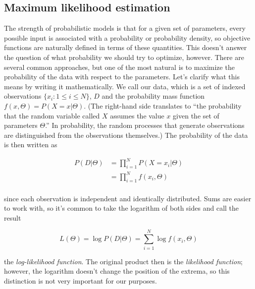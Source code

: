 \subsection{Maximum likelihood estimation}

The strength of probabilistic models is that for a given set of parameters, every possible input is associated with a probability or probability density, so objective functions are naturally defined in terms of these quantities. This doesn't answer the question of what probability we should try to optimize, however. There are several common approaches, but one of the most natural is to maximize the probability of the data with respect to the parameters. Let's clarify what this means by writing it mathematically. We call our data, which is a set of indexed observations $\{x_i:1 \le i \le N\}$, $D$ and the probability mass function $f(x, \Theta) = P(X = x | \Theta)$. (The right-hand side translates to ``the probability that the random variable called $X$ assumes the value $x$ given the set of parameters $\Theta$.'' In probability, the random processes that generate observations are distinguished from the observations themselves.) The probability of the data is then written as

\begin{align*}
P(D|\Theta)
&= \prod_{i=1}^N P(X=x_i | \Theta) \\
&= \prod_{i=1}^N f(x_i, \Theta) \\
\end{align*}

since each observation is independent and identically distributed. Sums are easier to work with, so it's common to take the logarithm of both sides and call the result

\begin{equation*}
L(\Theta) = \log P(D|\Theta) = \sum_{i=1}^N \log f(x_i, \Theta)
\end{equation*}

the \textit{log-likelihood function}. The original product then is the \textit{likelihood function}; however, the logarithm doesn't change the position of the extrema, so this distinction is not very important for our purposes.


